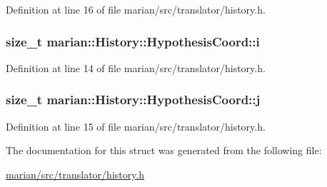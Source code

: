 Definition at line 16 of file marian/src/translator/history.\+h.

\subsubsection[{\texorpdfstring{i}{i}}]{\setlength{\rightskip}{0pt plus 5cm}size\+\_\+t marian\+::\+History\+::\+Hypothesis\+Coord\+::i}\hypertarget{structmarian_1_1History_1_1HypothesisCoord_a9ff840788af2130487c37489a6b44e00}{}\label{structmarian_1_1History_1_1HypothesisCoord_a9ff840788af2130487c37489a6b44e00}


Definition at line 14 of file marian/src/translator/history.\+h.

\subsubsection[{\texorpdfstring{j}{j}}]{\setlength{\rightskip}{0pt plus 5cm}size\+\_\+t marian\+::\+History\+::\+Hypothesis\+Coord\+::j}\hypertarget{structmarian_1_1History_1_1HypothesisCoord_a90222589cdb4675bc2fa5c22232be6e7}{}\label{structmarian_1_1History_1_1HypothesisCoord_a90222589cdb4675bc2fa5c22232be6e7}


Definition at line 15 of file marian/src/translator/history.\+h.



The documentation for this struct was generated from the following file\+:\begin{DoxyCompactItemize}
\item 
\hyperlink{marian_2src_2translator_2history_8h}{marian/src/translator/history.\+h}\end{DoxyCompactItemize}

